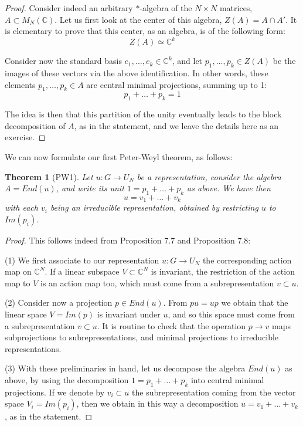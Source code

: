 \documentclass[12pt]{amsbook}
\newtheorem{theorem}{Theorem}[chapter]
\begin{document}
\begin{proof}
Consider indeed an arbitrary $*$-algebra of the $N\times N$ matrices, $A\subset M_N(\mathbb C)$. Let us first look at the center of this algebra, $Z(A)=A\cap A'$. It is elementary to prove that this center, as an algebra, is of the following form:
$$Z(A)\simeq\mathbb C^k$$

Consider now the standard basis $e_1,\ldots,e_k\in\mathbb C^k$, and let  $p_1,\ldots,p_k\in Z(A)$ be the images of these vectors via the above identification. In other words, these elements $p_1,\ldots,p_k\in A$ are central minimal projections, summing up to 1:
$$p_1+\ldots+p_k=1$$

The idea is then that this partition of the unity eventually leads to the block decomposition of $A$, as in the statement, and we leave the details here as an exercise.
\end{proof}

We can now formulate our first Peter-Weyl theorem, as follows:


\begin{theorem}[PW1]
Let $u:G\to U_N$ be a representation, consider the algebra $A=End(u)$, and write its unit $1=p_1+\ldots+p_k$ as above. We have then 
$$u=v_1+\ldots+v_k$$
with each $v_i$ being an irreducible representation, obtained by restricting $u$ to $Im(p_i)$.
\end{theorem}

\begin{proof}
This follows indeed from Proposition 7.7 and Proposition 7.8:

\medskip

(1) We first associate to our representation $u:G\to U_N$ the corresponding action map on $\mathbb C^N$. If a linear subspace $V\subset\mathbb C^N$ is invariant, the restriction of the action map to $V$ is an action map too, which must come from a subrepresentation $v\subset u$.

\medskip

(2) Consider now a projection $p\in End(u)$. From $pu=up$ we obtain that the linear space $V=Im(p)$ is invariant under $u$, and so this space must come from a subrepresentation $v\subset u$. It is routine to check that the operation $p\to v$ maps subprojections to subrepresentations, and minimal projections to irreducible representations.

\medskip

(3) With these preliminaries in hand, let us decompose the algebra $End(u)$ as above, by using the decomposition $1=p_1+\ldots+p_k$ into central minimal projections. If we denote by $v_i\subset u$ the subrepresentation coming from the vector space $V_i=Im(p_i)$, then we obtain in this way a decomposition $u=v_1+\ldots+v_k$, as in the statement.
\end{proof}
\end{document}

